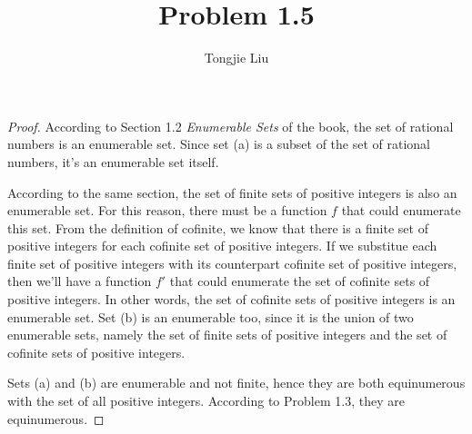 \documentclass{article}
\title{Problem 1.5}
\author{Tongjie Liu}
\begin{document}
\maketitle


\begin{proof}
	According to Section 1.2 \textit{Enumerable Sets} of the book,
the set of rational numbers is an enumerable set. Since set (a) is a
subset of the set of rational numbers, it's an enumerable set itself.

	According to the same section, the set of finite sets of positive
integers is also an enumerable set. For this reason, there must be a
function $f$ that could enumerate this set. From the definition of cofinite,
we know that there is a finite set of positive integers for each cofinite
set of positive integers. If we substitue each finite set of positive integers
with its counterpart cofinite set of positive integers, then we'll have a
function $f'$ that could enumerate the set of cofinite sets of positive
integers. In other words, the set of cofinite sets of positive integers
is an enumerable set. Set (b) is an enumerable too, since it is the union
of two enumerable sets, namely the set of finite sets of positive integers
and the set of cofinite sets of positive integers.

	Sets (a) and (b) are enumerable and not finite, hence they are both
equinumerous with the set of all positive integers. According to Problem 1.3,
they are equinumerous.
\end{proof}
\end{document}
